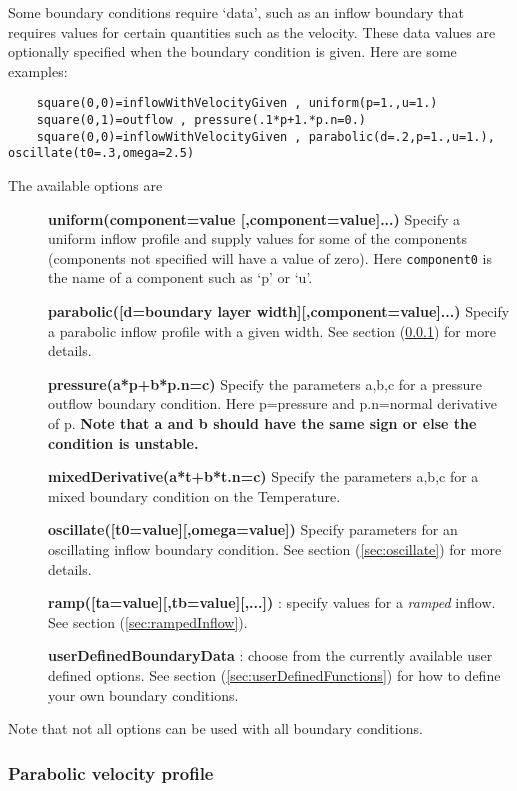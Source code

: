 Some boundary conditions require `data', such as an inflow
boundary that requires values for certain quantities such as the velocity. 
These data values are optionally specified when
the boundary condition is given. Here are some examples:
{\footnotesize
\begin{verbatim}
    square(0,0)=inflowWithVelocityGiven , uniform(p=1.,u=1.)
    square(0,1)=outflow , pressure(.1*p+1.*p.n=0.)
    square(0,0)=inflowWithVelocityGiven , parabolic(d=.2,p=1.,u=1.), oscillate(t0=.3,omega=2.5)
\end{verbatim}
}
The available options are
\begin{description}
  \item[]{\bf uniform(component=value [,component=value]...)} Specify a uniform inflow profile and supply
      values for some of the components (components not specified will have a value of zero). Here
     {\tt component0} is the name of a component such as `p' or `u'.
  \item[]{\bf parabolic([d=boundary layer width][,component=value]...)} Specify a parabolic inflow profile
     with a given width. See section (\ref{sec:parabolic}) for more details.
  \item[]{\bf pressure(a*p+b*p.n=c)} Specify the parameters a,b,c for a pressure outflow boundary condition.
	   Here p=pressure and p.n=normal derivative of p. 
	   {\bf Note that a and b should have the same sign or else the condition is unstable.}
  \item[]{\bf mixedDerivative(a*t+b*t.n=c)} Specify the parameters a,b,c for a mixed boundary condition
      on the Temperature. 
  \item[]{\bf oscillate([t0=value][,omega=value])} Specify parameters for an oscillating inflow boundary condition.
    See section (\ref{sec:oscillate}) for more details.
  \item[]{\bf ramp([ta=value][,tb=value][,...])}  : specify values for a {\sl ramped} inflow. 
    See section (\ref{sec:rampedInflow}).
  \item[]{\bf userDefinedBoundaryData} : choose from the currently available user defined options. See
      section (\ref{sec:userDefinedFunctions}) for how to define your own boundary conditions.
\end{description}
Note that not all options can be used with all boundary conditions. 

\subsubsection{Parabolic velocity profile} \label{sec:parabolic}


